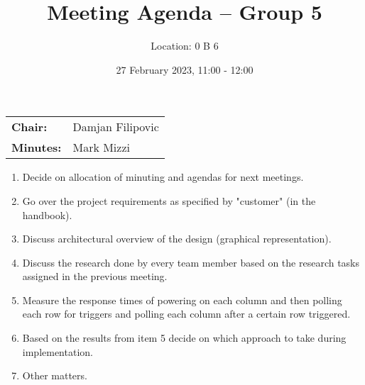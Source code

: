 \documentclass[11pt,a4paper]{scrartcl}
\title{Meeting Agenda -- Group 5}
\author{Location: 0 B 6}
\date{27 February 2023, 11:00 - 12:00}
\begin{document}
\maketitle
\begin{center}
\begin{tabular}{ll}
\textbf{Chair:}   & Damjan Filipovic \\
\textbf{Minutes:} & Mark Mizzi
\end{tabular}
\end{center}

\begin{enumerate}

    \item Decide on allocation of minuting and agendas for next meetings.

    \item Go over the project requirements as specified by "customer" (in the handbook).
    
    \item Discuss architectural overview of the design (graphical representation).
    
    \item Discuss the research done by every team member based on the research tasks assigned in the previous meeting.

    \item Measure the response times of powering on each column and then polling each row for triggers and polling each column after a certain row triggered.

    \item Based on the results from item 5 decide on which approach to take during implementation.
    
    \item Other matters.

\end{enumerate}
\end{document}
